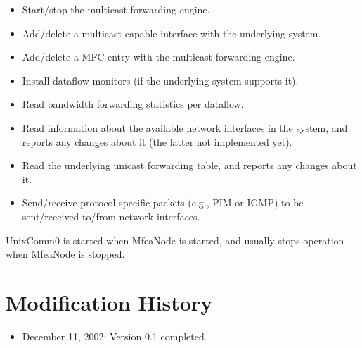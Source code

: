 \documentclass[11pt]{article}
\begin{document}
\begin{itemize}

  \item Start/stop the multicast forwarding engine.

  \item Add/delete a multicast-capable interface with the underlying
  system.

  \item Add/delete a MFC entry with the multicast forwarding engine.

  \item Install dataflow monitors (if the underlying system supports it).

  \item Read bandwidth forwarding statistics per dataflow.

  \item Read information about the available network interfaces in the
  system, and reports any changes about it (the latter not implemented yet).

  \item Read the underlying unicast forwarding table, and reports
  any changes about it.

  \item Send/receive protocol-specific packets (e.g., PIM or IGMP) to be
  sent/received to/from network interfaces.

\end{itemize}

UnixComm0 is started when MfeaNode is started, and usually stops
operation when MfeaNode is stopped.


\appendix
\section{Modification History}

\begin{itemize}

  \item December 11, 2002: Version 0.1 completed.

\end{itemize}





\end{document}
